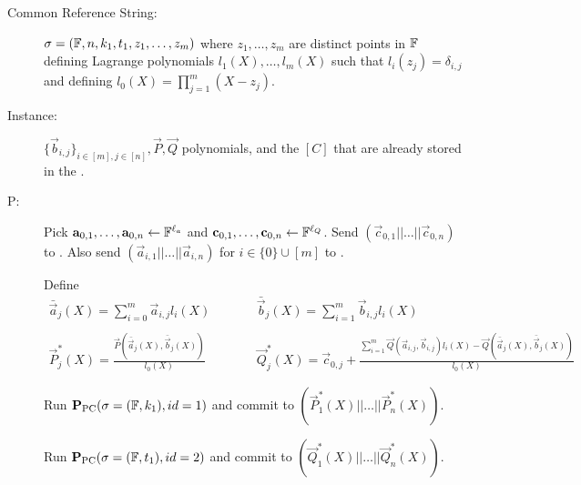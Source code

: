 \begin{description} \label{protmultiversion}
\item[Common Reference String:] $\mathsf{\sigma}=(\mathbb{F},n,k_1,t_1,z_1,\ldots,z_m)$ where $z_1,\ldots,z_m$ are distinct points in $\mathbb{F}$ defining Lagrange polynomials $l_1(X),\ldots,l_m(X)$ such that $l_i(z_j)=\delta_{i,j}$ and defining $l_0(X)=\prod_{j=1}^m(X-z_j)$.
%
\item[Instance:] $\lbrace \vec{b}_{i,j} \rbrace_{i \in [m], j \in [n]}, \vec{P},\vec{Q}$ polynomials, and the $[C]$ that are already stored in the \ILC.
%
\item[P:]
Pick $\mathbf{a}_{0,1},\ldots,\mathbf{a}_{0,n}\gets \mathbb{F}^{\ell_a}$ and $\mathbf{c}_{0,1},\ldots,\mathbf{c}_{0,n}\gets \mathbb{F}^{\ell_Q}$. Send $(\vec{c}_{0,1}||\ldots||\vec{c}_{0,n})$ to \ILC. Also send $\left( \vec{a}_{i,1}||\ldots||\vec{a}_{i,n}\right)$ for $i\in \{0\}\cup [m]$ to \ILC.

Define
$$\begin{array}{lll}
\bar{\vec{a}}_{j}(X) = \sum_{i=0}^m \vec{a}_{i,j} l_i(X) & \qquad &
\bar{\vec{b}}_{j}(X) = \sum_{i=1}^m \vec{b}_{i,j} l_i(X) \\ \\
\vec{P}_j^*(X)=\frac{\vec{P}\left(\bar{\vec{a}}_j(X),\bar{\vec{b}}_j(X)\right)}{l_0(X)} & & \vec{Q}_j^*(X)=\vec{c}_{0,j}+\frac{\sum_{i=1}^m\vec{Q}(\vec{a}_{i,j},\vec{b}_{i,j})l_i(X)-\vec{Q}\left(\bar{\vec{a}}_j(X),\bar{\vec{b}}_j(X)\right)}{l_0(X)}
\end{array}$$

Run $\textbf{P}_\mathrm{PC}(\mathsf{\sigma}=(\mathbb{F},k_1),id=1)$ and commit to $\left( \vec{P}_1^*(X)||\ldots||\vec{P}_n^*(X)\right)$.

Run $\textbf{P}_\mathrm{PC}(\mathsf{\sigma}=(\mathbb{F},t_1),id=2)$ and commit to $\left( \vec{Q}_1^*(X)||\ldots||\vec{Q}_n^*(X)\right)$.


\end{description}
